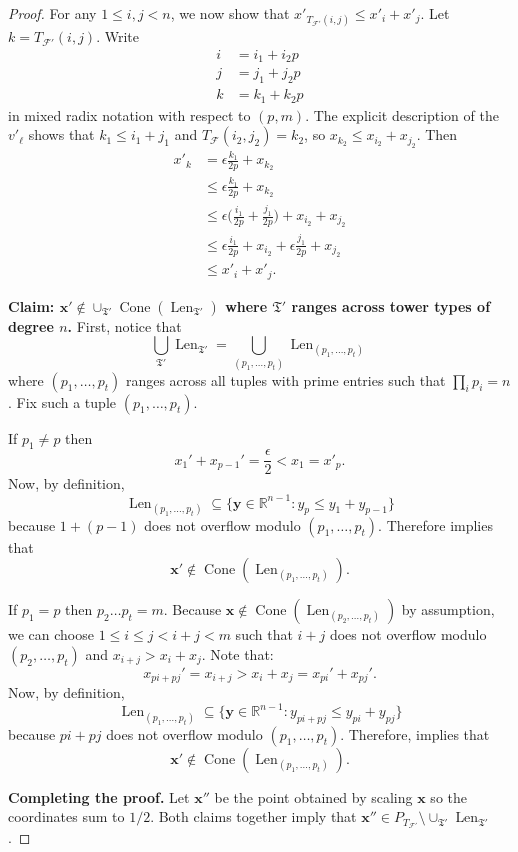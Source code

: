 \documentclass[letterpaper,10pt]{amsart}
\DeclareMathOperator{\Len}{Len}
\DeclareMathOperator{\Cone}{Cone}
\newcommand{\RR}{\mathbb{R}}      %
\newcommand{\mfT}{\mathfrak{T}}
\newcommand{\cF}{\mathcal{F}}
\theoremstyle{definition}
\theoremstyle{remark}
\begin{document}
\begin{proof}
For any $1 \leq i,j < n$, we now show that $x'_{T_{\cF'}(i,j)} \leq x'_i + x'_j$. Let $k = T_{\cF'}(i,j)$. Write
\begin{align*}
i &= i_1 + i_2 p \\
j &= j_1 + j_2 p \\
k &= k_1 + k_2 p
\end{align*}
in mixed radix notation with respect to $(p,m)$. The explicit description of the $v'_\ell$ shows that $k_1 \leq i_1+j_1$ and $T_{\cF}(i_2,j_2) = k_2$, so $x_{k_2}\leq x_{i_2}+x_{j_2}$. Then
\begin{align*}
x'_k &= \epsilon \frac{k_1}{2p} + x_{k_2} \\
&\leq \epsilon \frac{k_1}{2p} + x_{k_2}\\
&\leq \epsilon\bigg(\frac{i_1}{2p} + \frac{j_1}{2p}\bigg) + x_{i_2} + x_{j_2} \\
&\leq \epsilon \frac{i_1}{2p} + x_{i_2} + \epsilon \frac{j_1}{2p} + x_{j_2} \\
&\leq x'_i + x'_j.
\end{align*}

\noindent \textbf{Claim: $\mathbf{x}' \notin \cup_{\mfT'}\Cone(\Len_{\mfT'})$ where $\mfT'$ ranges across tower types of degree $n$.}
First, notice that
\[
    \bigcup_{\mfT'}\Len_{\mfT'} = \bigcup_{(p_1,\dots,p_t)}\Len_{(p_1,\dots,p_t)}
\]
where $(p_1,\dots,p_t)$ ranges across all tuples with prime entries such that $\prod_i p_i = n$. Fix such a tuple $(p_1,\dots,p_t)$.

If $p_1 \neq p$ then
\begin{equation}
\label{eqn:induction-3}
x_1'+x_{p-1}' = \frac{\epsilon}{2} < x_1 = x'_p.
\end{equation}
Now, by definition,
\[
    \Len_{(p_1,\dots,p_t)} \subseteq \{\mathbf{y} \in \RR^{n-1} : y_p \leq y_1 + y_{p-1}\}
\]
because $1 + (p-1)$ does not overflow modulo $(p_1,\dots,p_t)$. Therefore  implies that
\[
    \mathbf{x}' \notin \Cone(\Len_{(p_1,\dots,p_t)}).
\]

If $p_1 = p$ then $p_2\dots p_t = m$. Because $\mathbf{x} \notin \Cone(\Len_{(p_2,\dots,p_t)})$ by assumption, we can choose $1 \leq i \leq j < i+j < m$ such that $i+j$ does not overflow modulo $(p_2,\dots,p_t)$ and $x_{i+j} > x_i + x_j$. Note that:
\begin{equation}
\label{eqn:induction-4}
x_{pi+pj}' = x_{i+j} > x_{i} + x_{j} = x_{pi}' + x_{pj}'.
\end{equation}
Now, by definition,
\[
    \Len_{(p_1,\dots,p_t)} \subseteq \{\mathbf{y} \in \RR^{n-1} : y_{pi + pj} \leq y_{pi} + y_{pj}\}
\]
because $pi + pj$ does not overflow modulo $(p_1,\dots,p_t)$. Therefore,  implies that
\[
    \mathbf{x}' \notin \Cone(\Len_{(p_1,\dots,p_t)}).
\]

\noindent \textbf{Completing the proof.} Let $\mathbf{x}''$ be the point obtained by scaling $\mathbf{x}$ so the coordinates sum to $1/2$. Both claims together imply that $\mathbf{x}'' \in P_{T_{\cF'}} \setminus \cup_{\mfT'}\Len_{\mfT'}$.
\end{proof}
\end{document}
